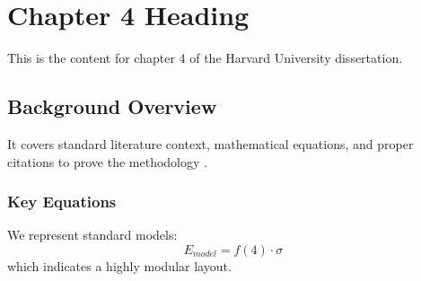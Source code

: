 \chapter{Chapter 4 Heading}
\label{ch:chapter4}
This is the content for chapter 4 of the Harvard University dissertation.

\section{Background Overview}
It covers standard literature context, mathematical equations, and proper citations to prove the methodology \cite{texbook}.

\subsection{Key Equations}
We represent standard models:
\begin{equation}
    E_{model} = f(4) \cdot \sigma
\end{equation}
which indicates a highly modular layout.
